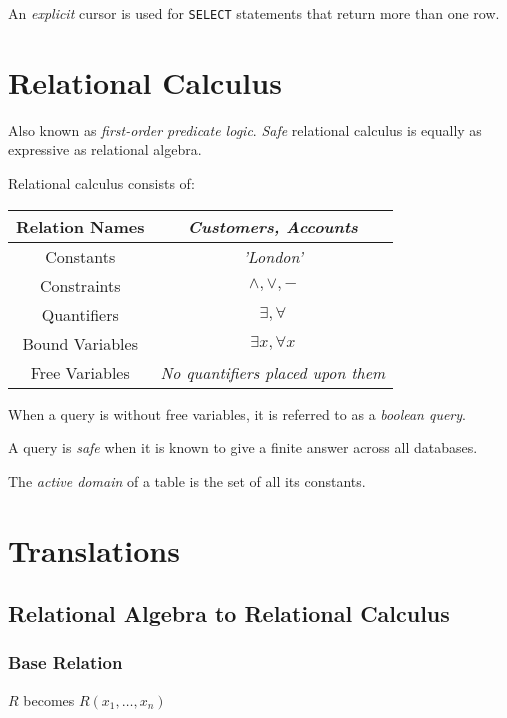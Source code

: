 \documentclass{article}
\begin{document}
An \textit{explicit} cursor is used for \texttt{SELECT} statements that return more than one row.

\section{Relational Calculus}

Also known as \textit{first-order predicate logic}. \textit{Safe} relational calculus is equally as expressive as relational algebra.

Relational calculus consists of:

\begin{center}
  \begin{tabular}{|c|c|}
    \hline
    Relation Names & \textit{Customers, Accounts}\\
    \hline
    Constants & \textit{'London'}\\
    \hline
    Constraints & $\wedge, \vee, -$\\
    \hline
    Quantifiers & $\exists, \forall$\\
    \hline
    Bound Variables & $\exists x, \forall x$\\
    \hline
    Free Variables & \textit{No quantifiers placed upon them}\\
    \hline
  \end{tabular}
\end{center}

When a query is without free variables, it is referred to as a \textit{boolean query}.

A query is \textit{safe} when it is known to give a finite answer across all databases.

The \textit{active domain} of a table is the set of all its constants.

\section{Translations}

\subsection{Relational Algebra to Relational Calculus}

\subsubsection{Base Relation}

$R$ becomes $R(x_1, \ldots, x_n)$
\end{document}
